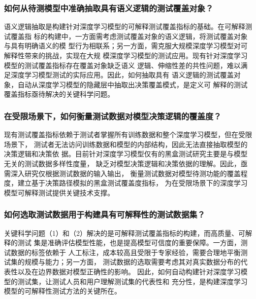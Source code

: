 \subsubsection{如何从待测模型中准确抽取具有语义逻辑的测试覆盖对象？}

语义逻辑抽取是构建针对深度学习模型的可解释测试覆盖指标的基础。在可解释测试覆盖指
标的构建中，一方面需考虑测试覆盖对象的语义逻辑，将测试覆盖对象与具有明确语义的模
型行为相联系；另一方面，需克服大规模深度学习模型对可解释性带来的挑战，实现在大规
模深度学习模型的测试应用。现有针对深度学习模型的测试覆盖指标存在覆盖对象缺乏语义
逻辑、伸缩性差的共性问题，难以满足深度学习模型测试的实际应用。因此，如何抽取具有
语义逻辑的测试覆盖对象，自动从深度学习模型的隐藏层中抽取出决策覆盖模式，是定义可
解释的测试覆盖指标亟待解决的关键科学问题。


\subsubsection{在受限场景下，如何衡量测试数据对模型决策逻辑的覆盖度？}
现有测试覆盖指标依赖于测试者掌握所有训练数据和整个深度学习模型，但在受限场景下，
测试者无法访问训练数据和模型的内部结构，因此无法直接抽取模型的决策逻辑和决策依
据。目前针对深度学习模型仅有的黑盒测试研究主要是与模型无关的测试数据多样性度量，
缺乏对模型决策逻辑和决策依据的理解。因此，亟需深入研究仅根据测试数据的输入输出，
衡量测试数据对模型待测功能的覆盖程度，建立基于决策路径模拟的黑盒测试覆盖度指标，
为在受限场景下的深度学习模型可解释测试提供关键技术支撑。


\subsubsection{如何选取测试数据用于构建具有可解释性的测试数据集？}
关键科学问题（1）和（2）解决的是可解释测试覆盖指标的构建，而高质量、可解释的测试
集是准确评估模型性能，也是提高模型可信度的重要保障。一方面，测试数据的标签依赖于
人工标注，成本较高且受限于专家经验，需要合理地平衡测试集的规模与能力；另一方面，
测试数据的选取需要考虑其对真实数据分布的代表性以及在边界数据对模型正确性的影响。
因此，如何自动构建针对深度学习模型的测试集，让测试人员和用户理解测试集的代表性和
充分性，是构建深度学习模型的可解释性测试方法的关键所在。

\iffalse

\begin{figure}[htp]
    \begin{small}
        \begin{center}
            \texttt{[image: ch2\_WBtest.pdf]}
        \end{center}
        \caption{基于层次语义理解的白盒测试研究内容}
        \label{fig:ch2:WBtest}
    \end{small}
\end{figure}


\begin{figure}[htp]
    \begin{small}
        \begin{center}
            \texttt{[image: ch2\_TestSelection.pdf]}
        \end{center}
        \caption{可解释预测模型研究内容}
        \label{fig:ch2:testselection}
    \end{small}
\end{figure}

\fi